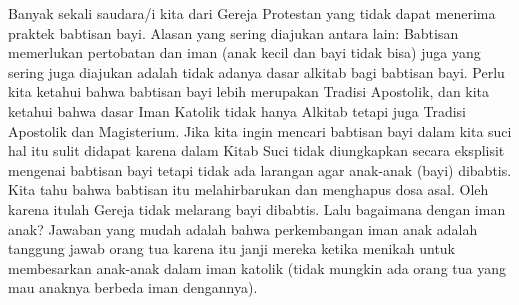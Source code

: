 
    Banyak sekali saudara/i kita dari Gereja Protestan yang tidak dapat menerima praktek babtisan bayi. Alasan yang sering diajukan antara lain: Babtisan memerlukan pertobatan dan iman (anak kecil dan bayi tidak bisa) juga yang sering juga diajukan adalah tidak adanya dasar alkitab bagi babtisan bayi.
        Perlu kita ketahui bahwa babtisan bayi lebih merupakan Tradisi Apostolik, dan kita ketahui bahwa dasar Iman Katolik tidak hanya Alkitab tetapi juga Tradisi Apostolik dan Magisterium. Jika kita ingin mencari babtisan bayi dalam kita suci hal itu sulit didapat karena dalam Kitab Suci tidak diungkapkan secara eksplisit mengenai babtisan bayi tetapi tidak ada larangan agar anak-anak (bayi) dibabtis. Kita tahu bahwa babtisan itu melahirbarukan dan menghapus dosa asal. Oleh karena itulah Gereja tidak melarang bayi dibabtis. Lalu bagaimana dengan iman anak? Jawaban yang mudah adalah bahwa perkembangan iman anak adalah tanggung jawab orang tua karena itu janji mereka ketika menikah untuk membesarkan anak-anak dalam iman katolik (tidak mungkin ada orang tua yang mau anaknya berbeda iman dengannya).
